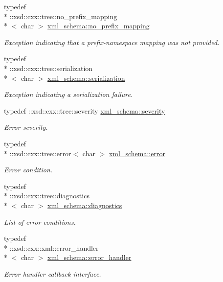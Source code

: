 \begin{DoxyCompactItemize}
typedef \\*
\+::xsd\+::cxx\+::tree\+::no\+\_\+prefix\+\_\+mapping\\*
$<$ char $>$ \hyperlink{namespacexml__schema_a03293581f2c90a05fbb910be49380e01}{xml\+\_\+schema\+::no\+\_\+prefix\+\_\+mapping}
\begin{DoxyCompactList}\small\item\em Exception indicating that a prefix-\/namespace mapping was not provided. \end{DoxyCompactList}\item 
typedef \\*
\+::xsd\+::cxx\+::tree\+::serialization\\*
$<$ char $>$ \hyperlink{namespacexml__schema_a40e04a11c9e6204762591b4de3755899}{xml\+\_\+schema\+::serialization}
\begin{DoxyCompactList}\small\item\em Exception indicating a serialization failure. \end{DoxyCompactList}\item 
typedef \+::xsd\+::cxx\+::tree\+::severity \hyperlink{namespacexml__schema_aaac8e21420b35e58ad94533db40ccf41}{xml\+\_\+schema\+::severity}
\begin{DoxyCompactList}\small\item\em Error severity. \end{DoxyCompactList}\item 
typedef \\*
\+::xsd\+::cxx\+::tree\+::error$<$ char $>$ \hyperlink{namespacexml__schema_a13e2122658f2abee3c2da9829f2de129}{xml\+\_\+schema\+::error}
\begin{DoxyCompactList}\small\item\em Error condition. \end{DoxyCompactList}\item 
typedef \\*
\+::xsd\+::cxx\+::tree\+::diagnostics\\*
$<$ char $>$ \hyperlink{namespacexml__schema_a62cc106990ec99fdaf2f3364d98cfabd}{xml\+\_\+schema\+::diagnostics}
\begin{DoxyCompactList}\small\item\em List of error conditions. \end{DoxyCompactList}\item 
typedef \\*
\+::xsd\+::cxx\+::xml\+::error\+\_\+handler\\*
$<$ char $>$ \hyperlink{namespacexml__schema_abdee01986b8e16f04af47dd12038261e}{xml\+\_\+schema\+::error\+\_\+handler}
\begin{DoxyCompactList}\small\item\em Error handler callback interface. \end{DoxyCompactList}\end{DoxyCompactItemize}
